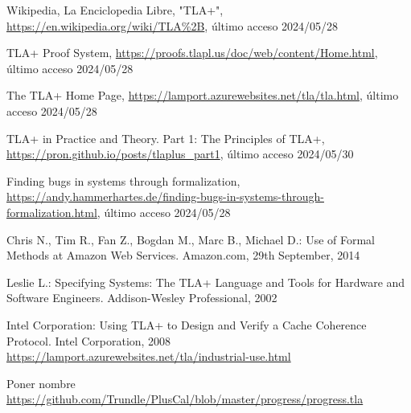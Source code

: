 \documentclass[runningheads]{llncs}
\begin{document}
\begin{thebibliography}{8}
Wikipedia, La Enciclopedia Libre, "TLA+", \url{https://en.wikipedia.org/wiki/TLA%2B}, último acceso 2024/05/28

TLA+ Proof System, \url{https://proofs.tlapl.us/doc/web/content/Home.html}, último acceso 2024/05/28

The TLA+ Home Page, \url{https://lamport.azurewebsites.net/tla/tla.html}, último acceso 2024/05/28

TLA+ in Practice and Theory. Part 1: The Principles of TLA+, \url{https://pron.github.io/posts/tlaplus_part1}, último acceso 2024/05/30

Finding bugs in systems through formalization, \url{https://andy.hammerhartes.de/finding-bugs-in-systems-through-formalization.html}, último acceso 2024/05/28

Chris N., Tim R., Fan Z., Bogdan M., Marc B., Michael D.: Use of Formal Methods at Amazon Web Services. Amazon.com, 29th September, 2014

Leslie L.: Specifying Systems: The TLA+ Language and Tools for Hardware and Software Engineers. Addison-Wesley Professional, 2002

Intel Corporation: Using TLA+ to Design and Verify a Cache Coherence Protocol. Intel Corporation, 2008
\url{https://lamport.azurewebsites.net/tla/industrial-use.html}

Poner nombre 
\url{https://github.com/Trundle/PlusCal/blob/master/progress/progress.tla}

\end{thebibliography}
\end{document}
